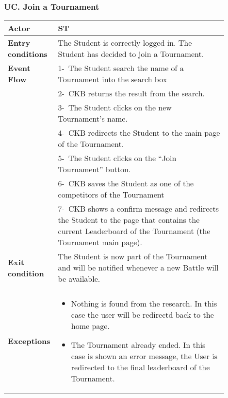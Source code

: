 \subsubsection*{UC\cuc . Join a Tournament}
\begin{center}
    \begin{longtable}{|l|p{0.9\linewidth}|}
        \hline
        \textbf{Actor}            & ST                                                                                                                                                                                        \\
        \hline
        \textbf{Entry conditions} & The Student is correctly logged in. The Student has decided to join a Tournament.                                                                                                                   \\
        \hline
        \textbf{Event Flow}       & 1-\ The Student search the name of a Tournament into the search box \\
        & 2-\ CKB returns the result from the search. \\
        & 3-\ The Student clicks on the new Tournament’s name.        \\
        & 4-\ CKB redirects the Student to the main page of the Tournament. \\
        & 5-\ The Student clicks on the “Join Tournament” button. \\
        & 6-\ CKB saves the Student as one of the competitors of the Tournament \\
        & 7-\ CKB shows a confirm message and redirects the Student to the page that contains the current Leaderboard of the Tournament (the Tournament main page). \\
        \hline
        \textbf{Exit condition}   & The Student is now part of the Tournament and will be notified whenever a new Battle will be available.        \\                                                                                                                                                                                \\
        \hline
        \textbf{Exceptions}        & \begin{itemize}
            \item Nothing is found from the research. In this case the user will be redirectd back to the home page.
            \item The Tournament already ended. In this case is shown an error message, the User is redirected to the final leaderboard of the Tournament.

\end{itemize}
\end{longtable}
\end{center}
